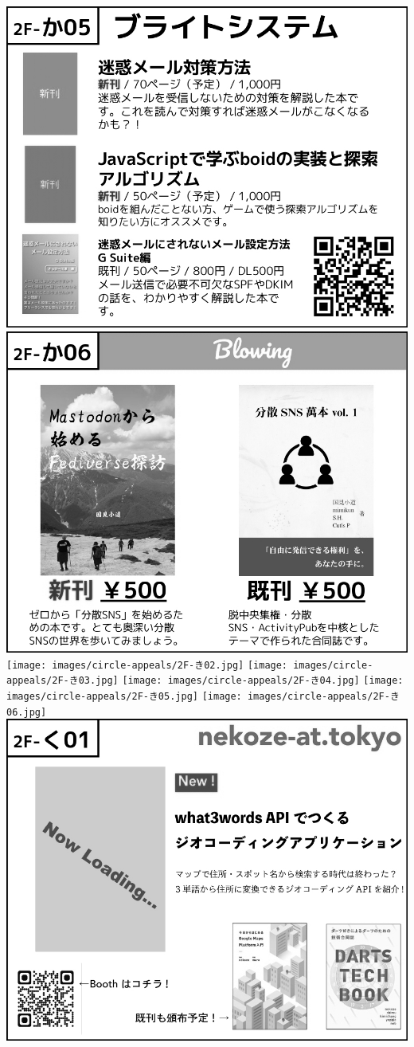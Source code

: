 \begin{center}
\includegraphics[width=0.9\linewidth]{images/circle-appeals/2F-か05.jpg}
\includegraphics[width=0.9\linewidth]{images/circle-appeals/2F-か06.jpg}
\texttt{[image: images/circle-appeals/2F-き02.jpg]}
\texttt{[image: images/circle-appeals/2F-き03.jpg]}
\texttt{[image: images/circle-appeals/2F-き04.jpg]}
\texttt{[image: images/circle-appeals/2F-き05.jpg]}
\texttt{[image: images/circle-appeals/2F-き06.jpg]}
\includegraphics[width=0.9\linewidth]{images/circle-appeals/2F-く01.jpg}

\end{center}

